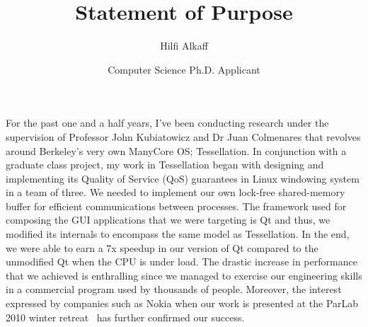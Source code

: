 \documentclass[12pt]{article}
\title{Statement of Purpose}
\author{Hilfi Alkaff}
\date{Computer Science Ph.D. Applicant}
\begin{document}
  \maketitle%

%
%
%
%

For the past one and a half years, I've been conducting research under the supervision of Professor John Kubiatowicz and Dr Juan Colmenares that revolves around Berkeley's very own ManyCore OS; Tessellation. In conjunction with a graduate class project, my work in Tessellation began with designing and implementing its Quality of Service (QoS) guarantees in Linux windowing system in a team of three. We needed to implement our own lock-free shared-memory buffer for efficient communications between processes. The framework used for composing the GUI applications that we were targeting is Qt and thus, we modified its internals to encompass the same model as Tessellation. In the end, we were able to earn a 7x speedup in our version of Qt compared to the unmodified Qt when the CPU is under load. The drastic increase in performance that we achieved is enthralling since we managed to exercise our engineering skills in a commercial program used by thousands of people. Moreover, the interest expressed by companies such as Nokia when our work is presented at the ParLab 2010 winter retreat~\cite{tess_retreat2010} has further confirmed our success. \newline
\end{document}
